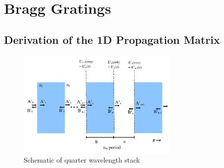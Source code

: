 \chapter[PDF Plots From Matlab]{Bragg Gratings}
\label{AppendixA}
\section{Derivation of the 1D Propagation Matrix }
\begin{figure}[h!]
	\centering
	\includegraphics[width=0.7\textwidth]{./Figures/HCPCF/DBR.png}
	\caption{Schematic of quarter wavelength stack}
	\label{1dstack}
\end{figure}

